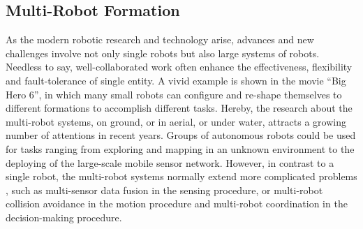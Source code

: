 \subsection{Multi-Robot Formation}

As the modern robotic research and technology arise, advances and new challenges
involve not only single robots but also large systems of robots. 
Needless to say, well-collaborated work often enhance the effectiveness, flexibility and
fault-tolerance of single entity. 
A vivid example is shown in the movie ``Big Hero 6'', in which many small robots can configure and re-shape themselves to different formations to accomplish different tasks.
Hereby, the research about the multi-robot systems, on ground, or in aerial, or under water, attracts a growing number of attentions in recent years\cite{CaoFukKahMen95, DudJenMilWil96, BahSoySah03}. 
Groups of autonomous robots could be used for tasks ranging from exploring and mapping in an unknown environment to the deploying of the large-scale mobile sensor network. 
However, in contrast to a single robot, the multi-robot systems normally extend more complicated problems , such as multi-sensor data fusion in the sensing procedure, or multi-robot collision
avoidance in the motion procedure and multi-robot coordination in the decision-making procedure.

